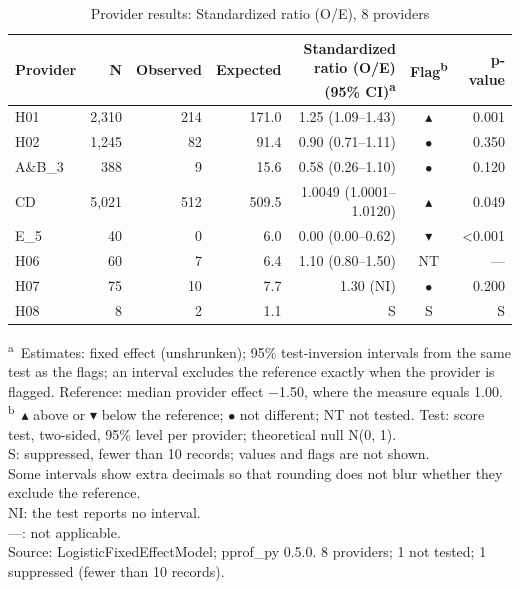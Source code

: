 \begin{table}[htbp]
\centering
\caption{Provider results: Standardized ratio (O/E), 8 providers}
\begin{tabular}{lrrrrcr}
\toprule
Provider & N & Observed & Expected & Standardized ratio (O/E) (95\% CI)\textsuperscript{a} & Flag\textsuperscript{b} & p-value \\
\midrule
H01 & 2,310 & 214 & 171.0 & 1.25 (1.09--1.43) & $\blacktriangle$ & 0.001 \\
H02 & 1,245 & 82 & 91.4 & 0.90 (0.71--1.11) & $\bullet$ & 0.350 \\
A\&B\_3 & 388 & 9 & 15.6 & 0.58 (0.26--1.10) & $\bullet$ & 0.120 \\
C\textbar{}D & 5,021 & 512 & 509.5 & 1.0049 (1.0001--1.0120) & $\blacktriangle$ & 0.049 \\
E\_5 & 40 & 0 & 6.0 & 0.00 (0.00--0.62) & $\blacktriangledown$ & \textless{}0.001 \\
H06 & 60 & 7 & 6.4 & 1.10 (0.80--1.50) & NT & --- \\
H07 & 75 & 10 & 7.7 & 1.30 (NI) & $\bullet$ & 0.200 \\
H08 & 8 & 2 & 1.1 & S & S & S \\
\bottomrule
\end{tabular}
\par\smallskip
\parbox{\linewidth}{\footnotesize \textsuperscript{a}~Estimates: fixed effect (unshrunken); 95\% test-inversion intervals from the same test as the flags; an interval excludes the reference exactly when the provider is flagged. Reference: median provider effect $-$1.50, where the measure equals 1.00.\\ \textsuperscript{b}~$\blacktriangle$ above or $\blacktriangledown$ below the reference; $\bullet$ not different; NT not tested. Test: score test, two-sided, 95\% level per provider; theoretical null N(0, 1).\\ S: suppressed, fewer than 10 records; values and flags are not shown.\\ Some intervals show extra decimals so that rounding does not blur whether they exclude the reference.\\ NI: the test reports no interval.\\ ---: not applicable.\\ Source: LogisticFixedEffectModel; pprof\_py 0.5.0. 8 providers; 1 not tested; 1 suppressed (fewer than 10 records).}
\end{table}
